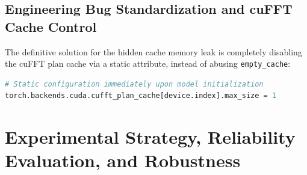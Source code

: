 \documentclass[12pt, a4paper]{article}
\begin{document}
\subsection{Engineering Bug Standardization and cuFFT Cache Control}
The definitive solution for the hidden cache memory leak is completely disabling the cuFFT plan cache via a static attribute, instead of abusing \texttt{empty\_cache}:
\begin{lstlisting}[language=Python]
# Static configuration immediately upon model initialization
torch.backends.cuda.cufft_plan_cache[device.index].max_size = 1
\end{lstlisting}

\section{Experimental Strategy, Reliability Evaluation, and Robustness}
\end{document}
